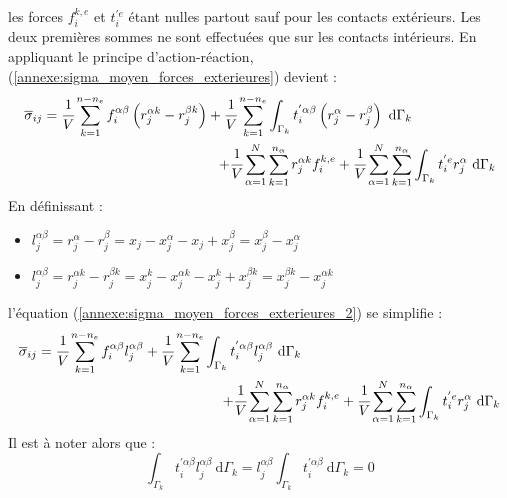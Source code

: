 les forces $f_i^{k,e}$ et $t_i^{'e}$ étant nulles partout sauf pour les contacts extérieurs. Les deux premières sommes ne sont effectuées que sur les contacts intérieurs. En appliquant le principe d'action-réaction, (\ref{annexe:sigma_moyen_forces_exterieures}) devient :
\begin{equation}\label{annexe:sigma_moyen_forces_exterieures_2}
	\begin{split}
	\overline{\sigma}_{ij}
	= \cfrac{1}{V} \sum_{k=1}^{n-n_e} f_i^{\alpha\beta} \left( r_j^{\alpha k} - r_j^{\beta k} \right)
	+ \cfrac{1}{V} \sum_{k=1}^{n-n_e} \int_{\Gamma_k} t_i^{'\alpha\beta} \left( r_j^\alpha - r_j^\beta \right)\ \mathrm{d} \Gamma_k\qquad\qquad\qquad \\
	+ \cfrac{1}{V} \sum_{\alpha=1}^N \sum_{k=1}^{n_\alpha} r_j^{\alpha k} f_i^{k,e}
	+ \cfrac{1}{V} \sum_{\alpha=1}^N \sum_{k=1}^{n_\alpha} \int_{\Gamma_k} t_i^{'e} r_j^\alpha\ \mathrm{d} \Gamma_k
	\end{split}
\end{equation}
En définissant :
\begin{itemize}
	\item $l_j^{\alpha\beta} = r_j^\alpha - r_j^\beta = x_j - x_j^\alpha - x_j + x_j^\beta = x_j^\beta - x_j^\alpha$
	\item $l_j^{\alpha\beta} = r_j^{\alpha k} - r_j^{\beta k} = x_j^k - x_j^{\alpha k} - x_j^k + x_j^{\beta k} = x_j^{\beta k} - x_j^{\alpha k}$
\end{itemize}
l'équation (\ref{annexe:sigma_moyen_forces_exterieures_2}) se simplifie :
\begin{equation}\label{annexe:sigma_moyen_forces_exterieures_3}
\begin{split}
\overline{\sigma}_{ij}
= \cfrac{1}{V} \sum_{k=1}^{n-n_e} f_i^{\alpha\beta} l_j^{\alpha\beta}
+ \cfrac{1}{V} \sum_{k=1}^{n-n_e} \int_{\Gamma_k} t_i^{'\alpha\beta} l_j^{\alpha\beta}\ \mathrm{d} \Gamma_k \hspace{5cm} \\
+ \cfrac{1}{V} \sum_{\alpha=1}^N \sum_{k=1}^{n_\alpha} r_j^{\alpha k} f_i^{k,e}
+ \cfrac{1}{V} \sum_{\alpha=1}^N \sum_{k=1}^{n_\alpha} \int_{\Gamma_k} t_i^{'e} r_j^\alpha\ \mathrm{d} \Gamma_k
\end{split}
\end{equation}
Il est à noter alors que :
\begin{equation}\label{annexe:couples_s_annulent}
	\int_{\Gamma_k} t_i^{'\alpha\beta} l_j^{\alpha\beta}\ \mathrm{d} \Gamma_k = l_j^{\alpha\beta} \int_{\Gamma_k} t_i^{'\alpha\beta}\ \mathrm{d} \Gamma_k = 0
\end{equation}
